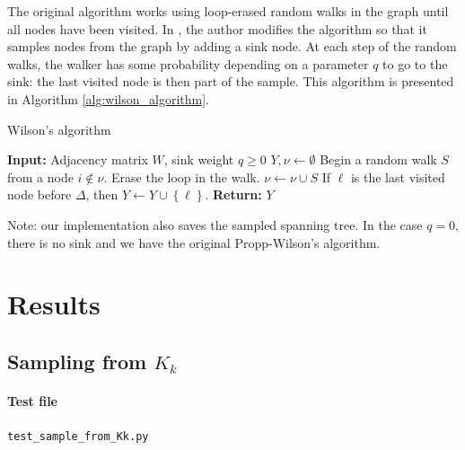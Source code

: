 \documentclass{article}
\begin{document}
The original algorithm works using loop-erased random walks in the graph until all nodes have been visited. In \cite{tremblay2017}, the author modifies the algorithm so that it samples nodes from the graph by adding a sink node. At each step of the random walks, the walker has some probability depending on a parameter $q$ to go to the sink: the last visited node is then part of the sample. This algorithm is presented in Algorithm \ref{alg:wilson_algorithm}.


\begin{algorithm}[ht]
\caption{Wilson's algorithm}
\label{alg:wilson_algorithm}
\begin{algorithmic} %
    \STATE \textbf{Input:} Adjacency matrix $W$, sink weight $q \geq 0$
    \STATE $Y, \nu \leftarrow \emptyset$
			\STATE Begin a random walk $S$ from a node $i \notin \nu$.
				\STATE Erase the loop in the walk.
				\STATE $\nu \leftarrow \nu \cup S$
					\STATE If $\ell$ is the last visited node before $\Delta$, then $Y \leftarrow Y \cup \left\{\ell\right\}$.
				\ENDIF
			\ENDIF
		\ENDWHILE
		\STATE \textbf{Return:} $Y$
\end{algorithmic}
Note: our implementation also saves the sampled spanning tree. In the case $q = 0$, there is no sink and we have the original Propp-Wilson's algorithm.
\end{algorithm}


\newpage
\section{Results}


\subsection[Sampling from Kk]{Sampling from $K_k$}


\paragraph{Test file} \verb#test_sample_from_Kk.py#
\end{document}

